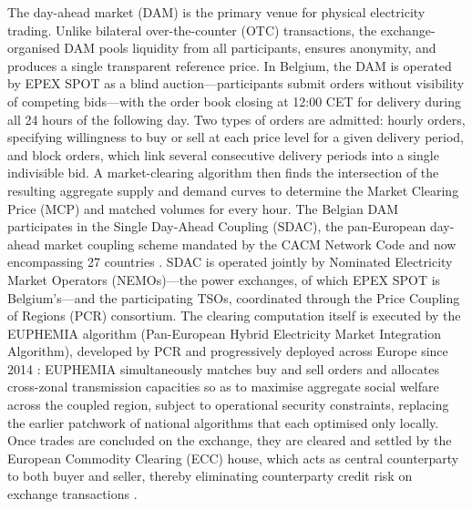 The day-ahead market (DAM) is the primary venue for physical electricity trading. Unlike bilateral over-the-counter (OTC) transactions, the exchange-organised DAM pools liquidity from all participants, ensures anonymity, and produces a single transparent reference price. In Belgium, the DAM is operated by EPEX SPOT as a blind auction—participants submit orders without visibility of competing bids—with the order book closing at 12:00 CET for delivery during all 24 hours of the following day. Two types of orders are admitted: hourly orders, specifying willingness to buy or sell at each price level for a given delivery period, and block orders, which link several consecutive delivery periods into a single indivisible bid. A market-clearing algorithm then finds the intersection of the resulting aggregate supply and demand curves to determine the Market Clearing Price (MCP) and matched volumes for every hour. The Belgian DAM participates in the Single Day-Ahead Coupling (SDAC), the pan-European day-ahead market coupling scheme mandated by the CACM Network Code and now encompassing 27 countries \cite{Regulation2019943_Consolidated2024}. SDAC is operated jointly by Nominated Electricity Market Operators (NEMOs)---the power exchanges, of which EPEX SPOT is Belgium's---and the participating TSOs, coordinated through the Price Coupling of Regions (PCR) consortium. The clearing computation itself is executed by the EUPHEMIA algorithm (Pan-European Hybrid Electricity Market Integration Algorithm), developed by PCR and progressively deployed across Europe since 2014 \cite{[search: EUPHEMIA Price Coupling Regions algorithm day-ahead welfare maximisation PCR 2014]}: EUPHEMIA simultaneously matches buy and sell orders and allocates cross-zonal transmission capacities so as to maximise aggregate social welfare across the coupled region, subject to operational security constraints, replacing the earlier patchwork of national algorithms that each optimised only locally. Once trades are concluded on the exchange, they are cleared and settled by the European Commodity Clearing (ECC) house, which acts as central counterparty to both buyer and seller, thereby eliminating counterparty credit risk on exchange transactions \cite{[search: ECC European Commodity Clearing central counterparty electricity spot market settlement]}.

